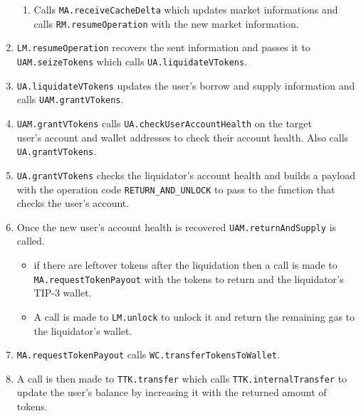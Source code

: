 \begin{enumerate}
\begin{enumerate}
    \item Calls \verb|MA.receiveCacheDelta| which updates market informations and calls \verb|RM.resumeOperation| with the new market information.
  \end{enumerate}
  \item \verb|LM.resumeOperation| recovers the sent information and passes it to \\\verb|UAM.seizeTokens| which calls \verb|UA.liquidateVTokens|.
  \item \verb|UA.liquidateVTokens| updates the user's borrow and supply information and calls \verb|UAM.grantVTokens|. 
  \item \verb|UAM.grantVTokens| calls \verb|UA.checkUserAccountHealth| on the target \\user's account and wallet addresses to check their account health. Also calls \verb|UA.grantVTokens|.
  \item \verb|UA.grantVTokens| checks the liquidator's account health and builds a payload with the operation code \verb|RETURN_AND_UNLOCK| to pass to the function that checks the user's account.
  \item Once the new user's account health is recovered \verb|UAM.returnAndSupply| is called.
  \begin{itemize}
    \item if there are leftover tokens after the liquidation then a call is made to \verb|MA.requestTokenPayout| with the tokens to return and the liquidator's TIP-3 wallet.
    \item A call is made to \verb|LM.unlock| to unlock it and return the remaining gas to the liquidator's wallet.
  \end{itemize}
  \item \verb|MA.requestTokenPayout| calls \verb|WC.transferTokensToWallet|.
  \item A call is then made to \verb|TTK.transfer| which calls \verb|TTK.internalTransfer| to update the user's balance by increasing it with the returned amount of tokens.
\end{enumerate}
